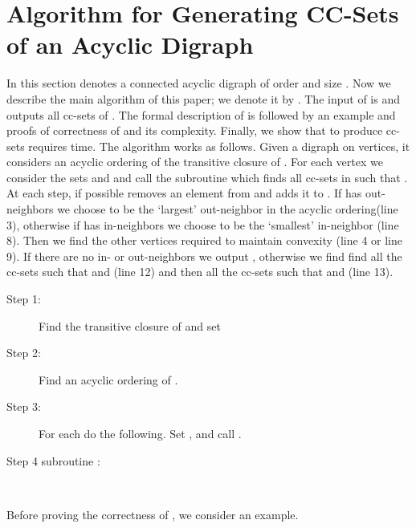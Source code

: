 \documentclass[11pt]{article}
\newcommand{\2}{\vspace{0.2 cm}}
\begin{document}
\section{Algorithm for Generating CC-Sets of an Acyclic
Digraph}\label{ccsec}

In this section  denotes a connected acyclic digraph of order 
and size . Now we describe the main algorithm of this paper; we
denote it by . The input of  is  and  outputs all cc-sets of . The formal description of 
is followed by an example and proofs of correctness of 
and its complexity. Finally, we show that to produce  cc-sets
 requires  time. The algorithm works as follows. 
Given a digraph
 on  vertices, it considers an acyclic ordering  of the
transitive closure of .
For each vertex  we consider the sets  and  and call the subroutine  which finds all cc-sets  in
 such
that .
At each step, if possible  removes an element  from  and adds
it to . If  has out-neighbors we choose  to be the
`largest' out-neighbor in the acyclic ordering(line 3), otherwise if  has
in-neighbors
we choose  to be the `smallest' in-neighbor (line 8).  Then we
find the other vertices required to maintain convexity (line 4 or
line 9). If there are no in- or out-neighbors we output ,
otherwise we find find all the cc-sets such that  and  (line 12) and then all the cc-sets
such that  and  (line
13). 


\begin{description}
  \item[Step 1:] Find the transitive closure of  and
  set 
  \item[Step 2:] Find an acyclic ordering  of
  .
  \item[Step 3:] For each  do the following.  Set ,
 and call .

\item[Step 4 subroutine :]\mbox{}\\
{ \obeylines{}}
\end{description}
Before proving the correctness of , we consider an example.
\end{document}

